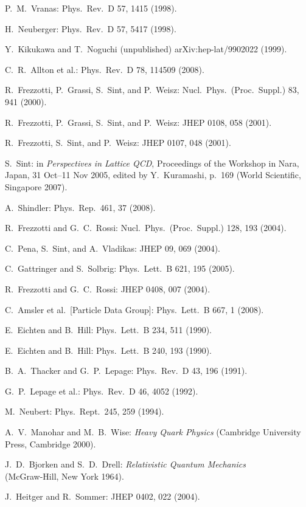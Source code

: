 \begin{enumerate}[label={[\arabic*]}]
  \item P.~M.~Vranas: Phys.\ Rev.\ D 57, 1415 (1998).
  \item H.~Neuberger: Phys.\ Rev.\ D 57, 5417 (1998).
  \item Y.~Kikukawa and T.~Noguchi (unpublished) arXiv:hep-lat/9902022
        (1999).
  \item C.~R.~Allton et al.: Phys.\ Rev.\ D 78, 114509 (2008).
  \item R.~Frezzotti, P.~Grassi, S.~Sint, and P.~Weisz: Nucl.\ Phys.\ (Proc.\
        Suppl.) 83, 941 (2000).
  \item R.~Frezzotti, P.~Grassi, S.~Sint, and P.~Weisz: JHEP 0108, 058 (2001).
  \item R.~Frezzotti, S.~Sint, and P.~Weisz: JHEP 0107, 048 (2001).
  \item S.~Sint: in \emph{Perspectives in Lattice QCD}, Proceedings of the
        Workshop in Nara, Japan, 31 Oct--11 Nov 2005, edited by Y.~Kuramashi,
        p.~169 (World Scientific, Singapore 2007).
  \item A.~Shindler: Phys.\ Rep.\ 461, 37 (2008).
  \item R.~Frezzotti and G.~C.~Rossi: Nucl.\ Phys.\ (Proc.\ Suppl.) 128, 193
        (2004).
  \item C.~Pena, S.~Sint, and A.~Vladikas: JHEP 09, 069 (2004).
  \item C.~Gattringer and S.~Solbrig: Phys.\ Lett.\ B 621, 195 (2005).
  \item R.~Frezzotti and G.~C.~Rossi: JHEP 0408, 007 (2004).
  \item C.~Amsler et al.\ [Particle Data Group]: Phys.\ Lett.\ B 667, 1
        (2008).
  \item E.~Eichten and B.~Hill: Phys.\ Lett.\ B 234, 511 (1990).
  \item E.~Eichten and B.~Hill: Phys.\ Lett.\ B 240, 193 (1990).
  \item B.~A.~Thacker and G.~P.~Lepage: Phys.\ Rev.\ D 43, 196 (1991).
  \item G.~P.~Lepage et al.: Phys.\ Rev.\ D 46, 4052 (1992).
  \item M.~Neubert: Phys.\ Rept.\ 245, 259 (1994).
  \item A.~V.~Manohar and M.~B.~Wise: \emph{Heavy Quark Physics} (Cambridge
        University Press, Cambridge 2000).
  \item J.~D.~Bjorken and S.~D.~Drell: \emph{Relativistic Quantum Mechanics}\\
        (McGraw-Hill, New York 1964).
  \item J.~Heitger and R.~Sommer: JHEP 0402, 022 (2004).

\end{enumerate}
